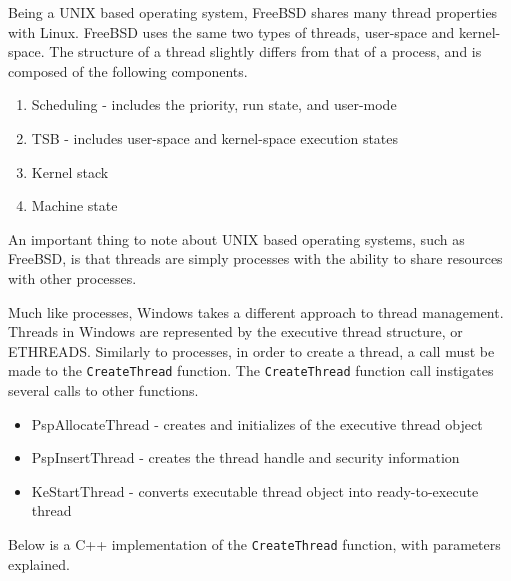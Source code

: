 \documentclass[10pt, onecolumn]{IEEEtran}
\begin{document}
        \vspace{3mm}
        
        Being a UNIX based operating system, FreeBSD shares many thread properties with Linux. FreeBSD uses the same two types of threads, user-space and kernel-space. The structure of a thread slightly differs from that of a process, and is composed of the following components.
        
        \begin{enumerate}
            \item Scheduling - includes the priority, run state, and user-mode
            \item TSB - includes user-space and kernel-space execution states
            \item Kernel stack
            \item Machine state
        \end{enumerate}
    
        An important thing to note about UNIX based operating systems, such as FreeBSD, is that threads are simply processes with the ability to share resources with other processes.
        
        \vspace{3mm}
        
        Much like processes, Windows takes a different approach to thread management. Threads in Windows are represented by the executive thread structure, or ETHREADS. Similarly to processes, in order to create a thread, a call must be made to the \texttt{CreateThread} function. The \texttt{CreateThread} function call instigates several calls to other functions.
        
        \begin{itemize}
            \item PspAllocateThread - creates and initializes of the executive thread object
            \item PspInsertThread - creates the thread handle and security information
            \item KeStartThread - converts executable thread object into ready-to-execute thread
        \end{itemize}
        
        Below is a C++ implementation of the \texttt{CreateThread} function, with parameters explained.
        
                
\end{document}
